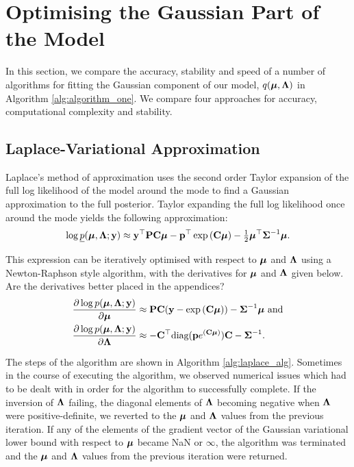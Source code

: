\documentclass{amsart}[12pt]
\newcommand{\mgc}[1]{{\color{blue}#1}}
\begin{document}
			\section{Optimising the Gaussian Part of the Model}
			\label{sec:gaussian}
					
			In this section, we compare the accuracy, stability and speed of a number of algorithms for fitting the
			Gaussian component of our model, $q({\boldsymbol \mu}, {\boldsymbol \Lambda})$ in Algorithm \ref{alg:algorithm_one}.  We compare four
			approaches for accuracy, computational complexity and stability.
				
			\subsection{Laplace-Variational Approximation}
					
			Laplace's method of approximation uses the second order Taylor expansion of the full log likelihood of the 
			model around the mode to find a Gaussian approximation to the full posterior. Taylor expanding the full log likelihood once around the mode yields the following approximation:
			\begin{align*}
				\log \underline{p}({\boldsymbol \mu}, {\boldsymbol \Lambda}; {\bf y}) \approx {\bf y}^\top{\bf P}{\bf C}{\boldsymbol\mu} - {\bf p}^\top\exp \left ({\bf C} {\boldsymbol \mu} \right ) - \tfrac{1}{2} {\boldsymbol \mu}^\top {\boldsymbol\Sigma}^{-1} {\boldsymbol \mu}. 
			\end{align*}
					
			\noindent This expression can be iteratively optimised with respect to ${\boldsymbol \mu}$ and ${\boldsymbol \Lambda}$ using a Newton-Raphson style algorithm, with the derivatives for ${\boldsymbol \mu}$ and ${\boldsymbol \Lambda}$ given below.
			\mgc{Are the derivatives better placed in the appendices?}
			\begin{align*}
				\frac{\partial \log p({\boldsymbol \mu}, {\boldsymbol \Lambda}; {\bf y})}{\partial {\boldsymbol\mu}}     & \approx {\bf P} {\bf C} ({\bf y} - \exp{({\bf C}{\boldsymbol\mu})}) - {\boldsymbol \Sigma}^{-1} {\boldsymbol \mu} \text{ and} \\
				\frac{\partial \log p({\boldsymbol \mu}, {\boldsymbol \Lambda}; {\bf y})}{\partial {\boldsymbol\Lambda}} & \approx - {\bf C}^\top \text{diag}({\bf p} e^{({\bf C} {\boldsymbol \mu})}) {\bf C} - {\boldsymbol \Sigma}^{-1}.   
			\end{align*}
					
			\noindent The steps of the algorithm are shown in Algorithm \ref{alg:laplace_alg}. Sometimes in the course of	executing the algorithm, we observed numerical issues which had to be dealt with in order for the
			algorithm to successfully complete. If the inversion  of ${\boldsymbol \Lambda}$ failing, the diagonal elements of
			${\boldsymbol \Lambda}$ becoming negative when ${\boldsymbol \Lambda}$ were positive-definite, we reverted to the ${\boldsymbol \mu}$ and
			${\boldsymbol \Lambda}$ values from the previous iteration. If any of the elements of the gradient vector of the
			Gaussian variational lower bound with respect to ${\boldsymbol \mu}$ became NaN or $\infty$, the algorithm was
			terminated and the ${\boldsymbol \mu}$ and ${\boldsymbol \Lambda}$ values from the previous iteration were returned.
					
\end{document}
